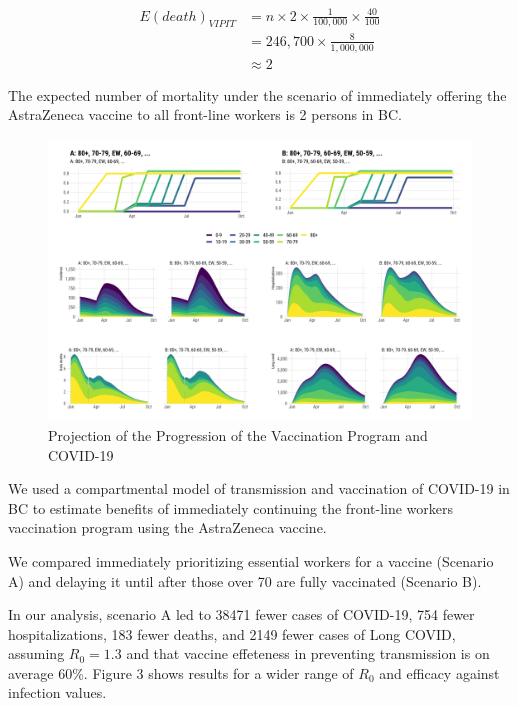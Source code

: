 \documentclass[]{interact}
\theoremstyle{plain}%
\theoremstyle{definition}
\theoremstyle{remark}
\begin{document}
\[
\begin{aligned}
E(death)_{VIPIT} & = n \times 2 \times \frac{1}{100,000} \times \frac{40}{100} \\
& = 246,700 \times \frac{8}{1,000,000} \\
& \approx 2  
\end{aligned}
\]

The expected number of mortality under the scenario of immediately
offering the AstraZeneca vaccine to all front-line workers is 2 persons
in BC.

\begin{figure}

{\centering \includegraphics[width=1\linewidth]{../figures/fig-trajectoriesFull} 

}

\caption{Projection of the Progression of the Vaccination Program and COVID-19}\label{fig:fig1}
\end{figure}

We used a compartmental model of transmission and vaccination of
COVID-19 in BC to estimate benefits of immediately continuing the
front-line workers vaccination program using the AstraZeneca vaccine.

We compared immediately prioritizing essential workers for a vaccine
(Scenario A) and delaying it until after those over 70 are fully
vaccinated (Scenario B).

In our analysis, scenario A led to 38471 fewer cases of COVID-19, 754
fewer hospitalizations, 183 fewer deaths, and 2149 fewer cases of Long
COVID, assuming \(R_0=1.3\) and that vaccine effeteness in preventing
transmission is on average 60\%. Figure 3 shows results for a wider
range of \(R_0\) and efficacy against infection values.
\end{document}
